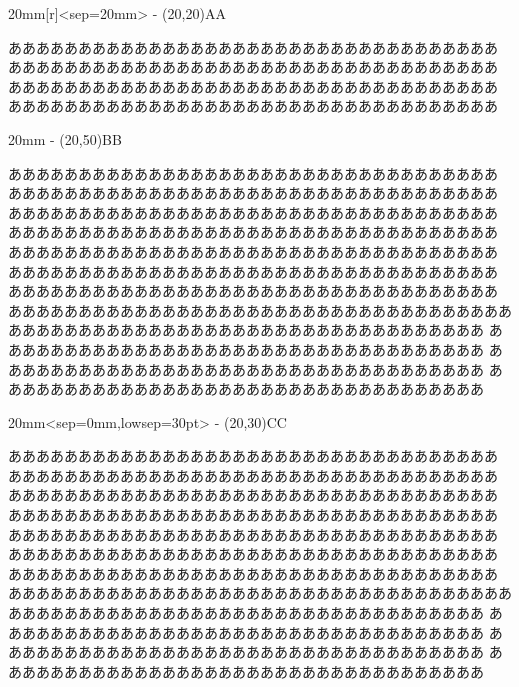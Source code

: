 \documentclass[twoside]{jarticle}
\begin{document}
\begin{kvwrapfigure}{20mm}[r]<sep=20mm>
\fboxsep-\fboxrule
\framebox(20,20){AA}
\end{kvwrapfigure}
あああああああああああああああああああああああああああああああああああ
あああああああああああああああああああああああああああああああああああ
あああああああああああああああああああああああああああああああああああ
あああああああああああああああああああああああああああああああああああ


\begin{kvwrapfigure}{20mm}
\fboxsep-\fboxrule
\framebox(20,50){BB}
\end{kvwrapfigure}
\the\wrapcolumnsep
あああああああああああああああああああああああああああああああああああ
あああああああああああああああああああああああああああああああああああ
あああああああああああああああああああああああああああああああああああ
あああああああああああああああああああああああああああああああああああ
あああああああああああああああああああああああああああああああああああ
あああああああああああああああああああああああああああああああああああ
あああああああああああああああああああああああああああああああああああ
ああああああああああああああああああああああああああああああああああああああああああああああああああああああああああああああああああああああ
あああああああああああああああああああああああああああああああああああ
あああああああああああああああああああああああああああああああああああ
あああああああああああああああああああああああああああああああああああ



\makeatletter
\begin{kvwrapfigure}{20mm}<sep=0mm,lowsep=30pt>
\fboxsep-\fboxrule
\framebox(20,30){CC}
\end{kvwrapfigure}
あああああああああああああああああああああああああああああああああああ
あああああああああああああああああああああああああああああああああああ
あああああああああああああああああああああああああああああああああああ
あああああああああああああああああああああああああああああああああああ
あああああああああああああああああああああああああああああああああああ
あああああああああああああああああああああああああああああああああああ
あああああああああああああああああああああああああああああああああああ
ああああああああああああああああああああああああああああああああああああああああああああああああああああああああああああああああああああああ
あああああああああああああああああああああああああああああああああああ
あああああああああああああああああああああああああああああああああああ
あああああああああああああああああああああああああああああああああああ
\end{document}
